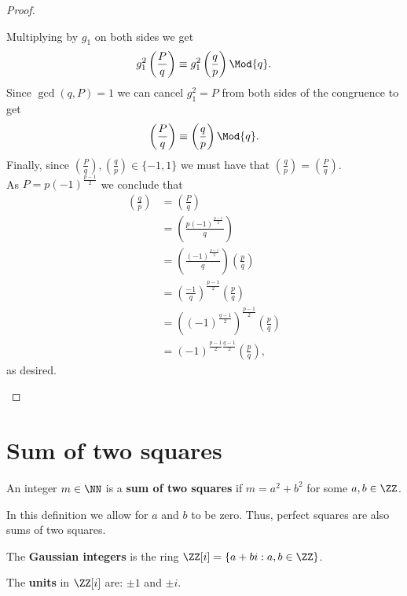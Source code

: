 \documentclass[12pt, a4paper]{article}
\begin{document}
\begin{proof}
\begin{enumerate}
        Multiplying by \(g_1\) on both sides we get 
        \[g_1^2\left( \frac{P}{q} \right) \equiv g_1^2\left( \frac{q}{p} \right) \Mod{q}.\]
        Since \(\gcd(q,P)=1\) we can cancel \(g_1^2=P\) from both sides of the congruence to get 
        \[\left( \frac{P}{q} \right) \equiv \left( \frac{q}{p} \right) \Mod{q}.\]
        Finally, since \(\left( \frac{P}{q} \right) , \left( \frac{q}{p} \right) \in \{-1,1\}\) we must have that \(\left( \frac{q}{p} \right) = \left( \frac{P}{q} \right)\). \\
        As \(P=p(-1)^{\frac{p-1}{2}}\) we conclude that 
        \[\begin{aligned}
            \left( \frac{q}{p} \right) &= \left( \frac{P}{q} \right) \\
            &= \left( \frac{p(-1)^{\frac{p-1}{2}}}{q} \right) \\
            &= \left(  \frac{(-1)^{\frac{p-1}{2}}}{q} \right) \left( \frac{p}{q} \right) \\
            &= \left( \frac{-1}{q} \right)^{\frac{p-1}{2}} \left( \frac{p}{q} \right) \\
            &= \left( (-1)^{\frac{q-1}{2}} \right)^{\frac{p-1}{2}} \left( \frac{p}{q} \right) \\
            &= (-1)^{\frac{p-1}{2} \frac{q-1}{2}} \left( \frac{p}{q} \right),
        \end{aligned}\]
        as desired.
    \end{enumerate}
\end{proof}

\section{Sum of two squares}

\begin{definition}
    An integer \(m \in \NN\) is a \textbf{sum of two squares} if \(m=a^2+b^2\) for some \(a,b\in \ZZ\).
\end{definition}

\begin{mdremark}
    In this definition we allow for \(a\) and \(b\) to be zero. Thus, perfect squares are also sums of two squares.
\end{mdremark}

\begin{definition}
    The \textbf{Gaussian integers} is the ring \(\ZZ[i] = \{a+bi : a,b \in \ZZ\}\).
\end{definition}

\begin{theorem}
    The \textbf{units} in \(\ZZ[i]\) are: \(\pm 1\) and \(\pm i\).
\end{theorem}
\end{document}
